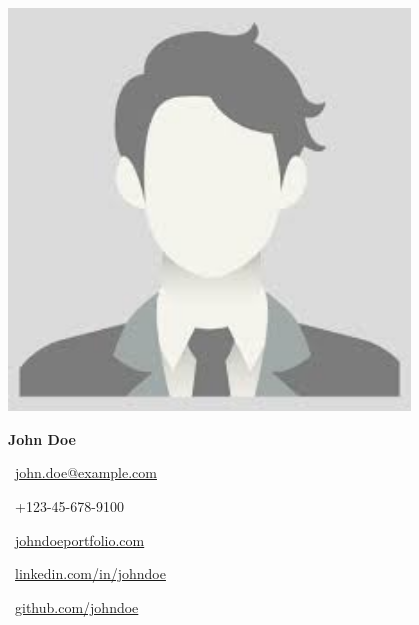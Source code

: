 \documentclass[a4paper,10pt]{article}
\begin{document}
    \begin{center}
        \begin{minipage}{0.3\textwidth}
            \includegraphics[width=0.8\textwidth,clip,keepaspectratio]{images/pic}
        \end{minipage}
        \hspace{10pt}
        \begin{minipage}{0.6\textwidth}
            \begin{flushright}
            {\Huge \textbf{John Doe}}

                \vspace{1em}
                \faEnvelope~\href{mailto:john.doe@example.com}{john.doe@example.com}

                \faPhone~+123-45-678-9100

                \faGlobe~\href{https://www.johndoeportfolio.com}{johndoeportfolio.com}

                \faLinkedin~\href{https://www.linkedin.com/in/johndoe}{linkedin.com/in/johndoe}

                \faGithub~\href{https://github.com/johndoe}{github.com/johndoe}
            \end{flushright}
        \end{minipage}

    \end{center}

    \vspace{2em}
\end{document}

